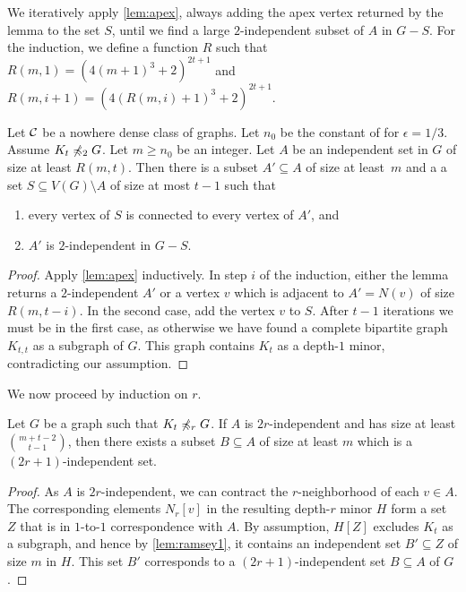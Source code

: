 We iteratively apply \cref{lem:apex}, always adding the apex vertex 
returned by the lemma to the set $S$, until we find a large 
$2$-independent subset of $A$ in $G-S$. For the induction, we
define a function $R$ such that $R(m,1)=(4(m+1)^3+2)^{2t+1}$
and $R(m, i+1)=(4(R(m,i)+1)^3+2)^{2t+1}$.

\begin{lemma}\label{lem:iterate-apex}
Let $\mathcal{C}$ be a nowhere dense class of graphs. 
Let $n_0$ be the constant of for $\epsilon=1/3$. 
Assume $K_t\not\preccurlyeq_2 G$. 
Let $m\geq n_0$ be an integer. 
Let $A$ be an independent set in $G$ of size at least $R(m,t)$. 
Then there is a subset $A'\subseteq A$ of size at least~$m$ and a 
a set $S\subseteq V(G)\setminus A$ of size at most $t-1$ such that
\begin{enumerate}
\item every vertex of $S$ is connected to every vertex of $A'$, and
\item $A'$ is $2$-independent in $G-S$. 
\end{enumerate} 
\end{lemma}
\begin{proof}
Apply \cref{lem:apex} inductively. In step $i$ of the induction,
either the lemma returns a $2$-independent $A'$ or a vertex $v$
which is adjacent to $A'=N(v)$ of size $R(m,t-i)$. In the second
case, add the vertex $v$ to $S$. After $t-1$
iterations we must be in the first case, as otherwise we have found a 
complete bipartite graph $K_{t,t}$ as a subgraph of $G$. 
This graph contains $K_t$ as a depth-$1$ minor, contradicting
our assumption. 
\end{proof}

We now proceed by induction on $r$. 

\begin{lemma}\label{lem:ramsey2}
Let $G$ be a graph such that $K_t\not\preccurlyeq_r G$. 
If $A$ is $2r$-independent and
has size at least $\binom{m+t-2}{t-1}$, then there exists
a subset $B\subseteq A$ of size at least $m$ which is a
$(2r+1)$-independent set. 
\end{lemma}
\begin{proof}
As $A$ is $2r$-independent, we can contract the $r$-neighborhood
of each $v\in A$. The corresponding elements $N_r[v]$ in the resulting 
depth-$r$ minor $H$ form a set $Z$ that is in \mbox{$1$-to-$1$} correspondence 
with $A$. By assumption, 
$H[Z]$ excludes $K_t$ as a subgraph, and hence by \cref{lem:ramsey1},
it contains an independent set $B'\subseteq Z$ of size $m$ in $H$. 
This set $B'$ corresponds to a $(2r+1)$-independent set $B\subseteq A$ of $G$. 
\end{proof}

